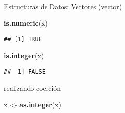 \documentclass[ignorenonframetext,]{beamer}
\newenvironment{Shaded}{\begin{snugshade}}{\end{snugshade}}
\newcommand{\KeywordTok}[1]{\textcolor[rgb]{0.13,0.29,0.53}{\textbf{#1}}}
\newcommand{\StringTok}[1]{\textcolor[rgb]{0.31,0.60,0.02}{#1}}
\newcommand{\NormalTok}[1]{#1}
\begin{document}
\begin{frame}[fragile]{Estructuras de Datos: Vectores (vector)}

\begin{Shaded}
\begin{Highlighting}[]
\KeywordTok{is.numeric}\NormalTok{(x)}
\end{Highlighting}
\end{Shaded}

\begin{verbatim}
## [1] TRUE
\end{verbatim}

\begin{Shaded}
\begin{Highlighting}[]
\KeywordTok{is.integer}\NormalTok{(x)}
\end{Highlighting}
\end{Shaded}

\begin{verbatim}
## [1] FALSE
\end{verbatim}

realizando coerción

\begin{Shaded}
\begin{Highlighting}[]
\NormalTok{x <-}\StringTok{ }\KeywordTok{as.integer}\NormalTok{(x)}
\end{Highlighting}
\end{Shaded}

\end{frame}
\end{document}
